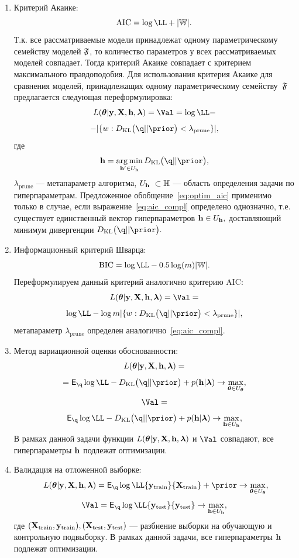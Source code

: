 \begin{enumerate}
\item Критерий Акаике:
\[
   \text{AIC} =  \log \LL + |\Wb|.
\]
Т.к. все рассматриваемые модели принадлежат одному параметрическому семейству моделей $\mathfrak{F}$, то количество параметров у всех рассматриваемых моделей  совпадает. Тогда критерий Акаике совпадает с критерием максимального правдоподобия. Для использования критерия Акаике для сравнения моделей, принадлежащих одному параметрическому семейству~$\mathfrak{F}$ предлагается следующая переформулировка:
\begin{equation}
\label{eq:optim_aic}
    \Loss = \Val = \log \LL - 
\end{equation}
\[
 - |\{w: \KL{\q}{\prior}<\lambda_\text{prune}\}|,
\]
где 
\begin{equation}\label{eq:aic_compl}\h=\argmin_{\h' \in \Uh} \KL{\q}{\prior},\end{equation} $\lambda_{\text{prune}}$ --- метапараметр алгоритма, $\Uh  \subset \Hb$ --- область определения задачи по гиперпараметрам. Предложенное обобщение~\eqref{eq:optim_aic} применимо только в случае, если выражение~\eqref{eq:aic_compl} определено однозначно, т.е. существует единственный вектор гиперпараметров  $\mathbf{h} \in U_{\mathbf{h}},$ доставляющий минимум дивергенции $\KL{\q}{\prior}.$

\item Информационный критерий Шварца:
\[
    \text{BIC} = \log \LL -0.5\log(m)|\Wb|.
\]
Переформулируем данный критерий аналогично критерию AIC:
\begin{equation}
\label{eq:optim_bic}
    \Loss = \Val =  
\end{equation}
\[
\log \LL - \log m |\{w: \KL{\q}{\prior}<\lambda_{\text{prune}}\}|,
\]
метапараметр $\lambda_{\text{prune}}$ определен аналогично~\eqref{eq:aic_compl}.

\item Метод вариационной оценки обоснованности:
\begin{equation}
\label{eq:optim_elbo_method}   
    L(\boldsymbol{\theta} |\mathbf{y},\mathbf{X},\mathbf{h},\boldsymbol{\lambda}) = 
\end{equation}
\[
= \E_{\q} \log \LL - \KL{\q}{\prior} + \priorh \to \max_{\teta \in \Uteta},
\]
\[
     \Val = 
\]
\[
\E_{\q} \log \LL - \KL{\q}{\prior} + \priorh \to \max_{\h \in \Uh},
\]
В рамках данной задачи функции $L(\boldsymbol{\theta} |\mathbf{y},\mathbf{X},\mathbf{h},\boldsymbol{\lambda})$ и $\Val$ совпадают, все гиперпараметры $\mathbf{h}$ подлежат оптимизации.

\item Валидация на отложенной выборке:
\begin{equation}
\label{eq:optim_hold_out}
    \Loss = \E_{\q} \log \LL{\y_\text{train}}{\X_\text{train}} + \prior \to \max_{\teta \in \Uteta},
\end{equation}
\[
    \Val = \E_{\q} \log \LL{\y_\text{test}}{\y_\text{test}} \to \max_{\h \in \Uh},
\]
где $(\mathbf{X}_\text{train}, \mathbf{y}_\text{train}), (\mathbf{X}_\text{test}, \mathbf{y}_\text{test})$ --- разбиение выборки на обучающую и контрольную подвыборку.
В рамках данной задачи, все гиперпараметры $\mathbf{h}$ подлежат оптимизации.

\end{enumerate}

